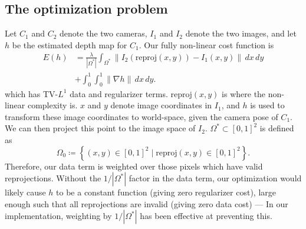 \documentclass[conference]{IEEEtran}
\begin{document}
\subsection{The optimization problem}
Let $C_1$ and $C_2$ denote the two cameras, $I_1$ and $I_2$ denote the two images, and let $h$ be the estimated depth map for $C_1$.
Our fully non-linear cost function is
\begin{equation}\label{nonlinear_cost}
\begin{split}
E(h) &= \frac{\lambda}{|\Omega^*|}\int_{\Omega^*}\left\|I_2(\text{reproj}(x,y)) - I_1(x,y)\right\|\,dx\,dy \\
     &+ \int_0^1\int_0^1\|\nabla h\| \,dx\,dy.
\end{split}
\end{equation}
which has TV-$L^1$ \cite{tv_optical_flow} data and regularizer terms. $\text{reproj}(x,y)$ is where the non-linear complexity is.
$x$ and $y$ denote image coordinates in $I_1$, and $h$ is used to transform these image coordinates to world-space,
given the camera pose of $C_1$. We can then project this point to the image space of $I_2$. $\Omega^* \subset [0,1]^2$
is defined as
\begin{equation}
    \Omega_0 \coloneqq \left\{(x,y) \in [0,1]^2 \mid \text{reproj}(x,y) \in [0,1]^2\right\}.
\end{equation}
Therefore, our data term is weighted over those pixels which have valid reprojections. Without the $1/|\Omega^*|$ factor
in the data term, our optimization would likely cause $h$ to be a constant function (giving zero regularizer cost), large enough such that
all reprojections are invalid (giving zero data cost) --- In our implementation, weighting by $1/|\Omega^*|$ has been effective at preventing this.
\end{document}
